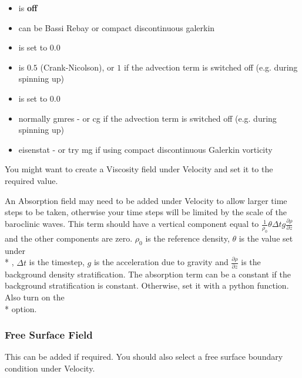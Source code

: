 \begin{itemize}
\item {} is \textbf{off}
\item {} can be Bassi Rebay or compact discontinuous galerkin
\item {} is set to $0.0$
\item {} is $0.5$ (Crank-Nicolson), or $1$ if the advection term is switched off (e.g. during spinning up)
\item {} is set to $0.0$
\item {} normally gmres - or cg if the advection term is switched off (e.g. during spinning up)
\item {} eisenstat - or try mg if using compact discontinuous Galerkin vorticity
\end{itemize}


You might want to create a Viscosity field under Velocity and set it to the required value. 

An Absorption field may need to be added under Velocity to allow larger time steps to be taken, otherwise your time steps will be limited by the scale of the baroclinic waves.  This term should have a vertical component equal to  ${\frac{1}{\rho_0}} {\theta} {\Delta} {t} {g} {\frac{\partial \rho}{\partial z}}$ and the other components are zero. $\rho_0$ is the reference density, $\theta$ is the value set under \\* , ${\Delta} {t} $ is the timestep, $g$ is the acceleration due to gravity and $\frac{\partial \rho}{\partial z}$ is the background density stratification.  The absorption term can be a constant if the background stratification is constant. Otherwise, set it with a python function.  Also turn on the \\*  option.

\subsubsection{Free Surface Field}
This can be added if required.  You should also select a free surface boundary condition under Velocity.

